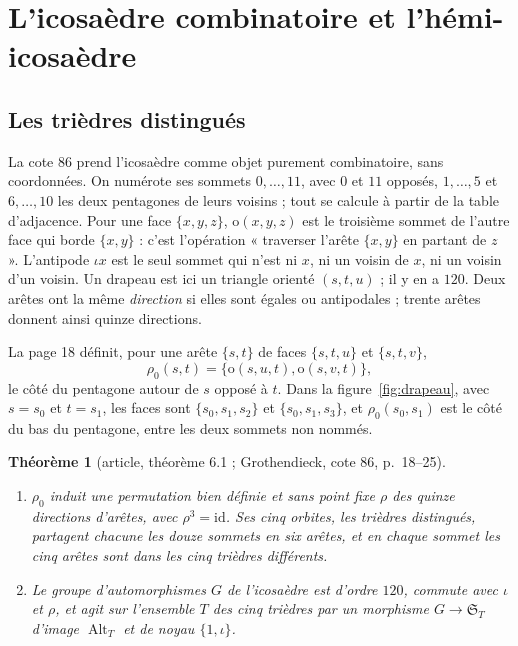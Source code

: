 \documentclass[11pt,a4paper]{amsart}
\theoremstyle{definition}
\theoremstyle{plain}
\newtheorem{theoreme}{Théorème}
\theoremstyle{remark}
\newcommand{\id}{\mathrm{id}}
\newcommand{\Alt}{\operatorname{Alt}}
\begin{document}
\section{L'icosaèdre combinatoire et l'hémi-icosaèdre}

\subsection{Les trièdres distingués}

La cote 86 prend l'icosaèdre comme objet purement combinatoire, sans coordonnées. On numérote ses sommets $0, \dots, 11$, avec $0$ et $11$ opposés, $1, \dots, 5$ et $6, \dots, 10$ les deux pentagones de leurs voisins ; tout se calcule à partir de la table d'adjacence. Pour une face $\{x, y, z\}$, $\mathrm o(x, y, z)$ est le troisième sommet de l'autre face qui borde $\{x, y\}$ : c'est l'opération « traverser l'arête $\{x,y\}$ en partant de $z$ ». L'antipode $\iota x$ est le seul sommet qui n'est ni $x$, ni un voisin de $x$, ni un voisin d'un voisin. Un drapeau est ici un triangle orienté $(s, t, u)$ ; il y en a $120$. Deux arêtes ont la même \emph{direction} si elles sont égales ou antipodales ; trente arêtes donnent ainsi quinze directions.

La page 18 définit, pour une arête $\{s, t\}$ de faces $\{s, t, u\}$ et $\{s, t, v\}$,
\[
\rho_0(s, t) = \{\mathrm o(s, u, t), \mathrm o(s, v, t)\},
\]
le côté du pentagone autour de $s$ opposé à $t$. Dans la figure~\ref{fig:drapeau}, avec $s = s_0$ et $t = s_1$, les faces sont $\{s_0, s_1, s_2\}$ et $\{s_0, s_1, s_3\}$, et $\rho_0(s_0, s_1)$ est le côté du bas du pentagone, entre les deux sommets non nommés.

\begin{theoreme}[article, théorème 6.1 ; Grothendieck, cote 86, p.~18--25]
\leavevmode
\begin{enumerate}
\item $\rho_0$ induit une permutation bien définie et sans point fixe $\rho$ des quinze directions d'arêtes, avec $\rho^3 = \id$. Ses cinq orbites, les \emph{trièdres distingués}, partagent chacune les douze sommets en six arêtes, et en chaque sommet les cinq arêtes sont dans les cinq trièdres différents.
\item Le groupe d'automorphismes $G$ de l'icosaèdre est d'ordre $120$, commute avec $\iota$ et $\rho$, et agit sur l'ensemble $T$ des cinq trièdres par un morphisme $G \to \mathfrak S_T$ d'image $\Alt_T$ et de noyau $\{1, \iota\}$.
\end{enumerate}
\end{theoreme}
\end{document}
